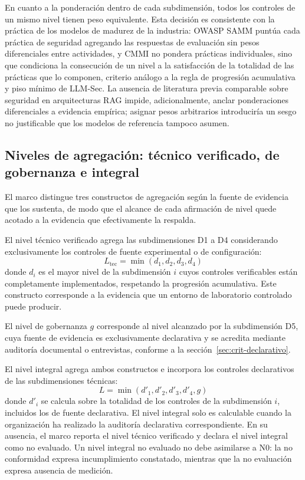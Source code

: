En cuanto a la ponderación dentro de cada subdimensión, todos los controles de un mismo nivel tienen peso equivalente. Esta decisión es consistente con la práctica de los modelos de madurez de la industria: OWASP SAMM \cite{owaspsamm} puntúa cada práctica de seguridad agregando las respuestas de evaluación sin pesos diferenciales entre actividades, y CMMI \cite{cmmi} no pondera prácticas individuales, sino que condiciona la consecución de un nivel a la satisfacción de la totalidad de las prácticas que lo componen, criterio análogo a la regla de progresión acumulativa y piso mínimo de LLM-Sec. La ausencia de literatura previa comparable sobre seguridad en arquitecturas RAG impide, adicionalmente, anclar ponderaciones diferenciales a evidencia empírica; asignar pesos arbitrarios introduciría un sesgo no justificable que los modelos de referencia tampoco asumen.

\subsection{Niveles de agregación: técnico verificado, de gobernanza e integral}
\label{mad:constructos-agregacion}

El marco distingue tres constructos de agregación según la fuente de evidencia que los sustenta, de modo que el alcance de cada afirmación de nivel quede acotado a la evidencia que efectivamente la respalda.

El nivel técnico verificado agrega las subdimensiones D1 a D4 considerando exclusivamente los controles de fuente experimental o de configuración:
\begin{equation}
L_{\text{tec}} = \min(d_1, d_2, d_3, d_4)
\end{equation}
donde $d_i$ es el mayor nivel de la subdimensión $i$ cuyos controles verificables están completamente implementados, respetando la progresión acumulativa. Este constructo corresponde a la evidencia que un entorno de laboratorio controlado puede producir.

El nivel de gobernanza $g$ corresponde al nivel alcanzado por la subdimensión D5, cuya fuente de evidencia es exclusivamente declarativa y se acredita mediante auditoría documental o entrevistas, conforme a la sección~\ref{sec:crit-declarativo}.

El nivel integral agrega ambos constructos e incorpora los controles declarativos de las subdimensiones técnicas:
\begin{equation}
L = \min(d'_1, d'_2, d'_3, d'_4, g)
\end{equation}
donde $d'_i$ se calcula sobre la totalidad de los controles de la subdimensión $i$, incluidos los de fuente declarativa. El nivel integral solo es calculable cuando la organización ha realizado la auditoría declarativa correspondiente. En su ausencia, el marco reporta el nivel técnico verificado y declara el nivel integral como no evaluado. Un nivel integral no evaluado no debe asimilarse a N0: la no conformidad expresa incumplimiento constatado, mientras que la no evaluación expresa ausencia de medición.

